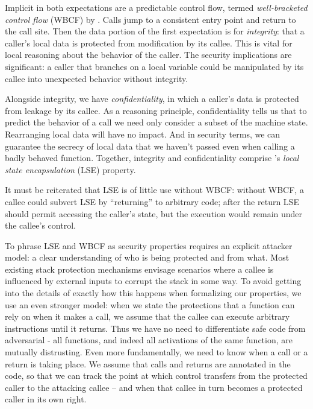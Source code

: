 \documentclass[acmsmall,review,anonymous]{acmart}\settopmatter{printfolios=true,printccs=false,printacmref=false}
\begin{document}

Implicit in both expectations are a predictable control flow, termed {\em well-bracketed
control flow} (WBCF) by \citeauthor{Skorstengaard+19}. Calls jump to a consistent entry
point and return to the call site. Then the data portion of the first expectation is for
{\em integrity}: that a caller's local data is protected from modification by its callee.
This is vital for local reasoning about the behavior of the caller. The security implications
are significant: a caller that branches on a local variable could be manipulated by its
callee into unexpected behavior without integrity.

Alongside integrity, we have {\em confidentiality}, in which a caller's data is protected
from leakage by its callee. As a reasoning principle, confidentiality tells us that to
predict the behavior of a call we need only consider a subset of the machine state.
Rearranging local data will have no impact. And in security terms, we can guarantee
the secrecy of local data that we haven't passed even when calling a badly behaved function.
Together, integrity and confidentiality comprise \citeauthor{Skorstengaard+19}'s
{\em local state encapsulation} (LSE) property.

It must be reiterated that LSE is of little use without WBCF: without WBCF, a callee
could subvert LSE by ``returning'' to arbitrary code; after the return LSE should permit
accessing the caller's state, but the execution would remain under the callee's control.

To phrase LSE and WBCF as security properties requires an explicit attacker model:
a clear understanding of who is being protected and from what. Most existing
stack protection mechanisms envisage scenarios where a callee is
influenced by external inputs to corrupt the stack in some way. To
avoid getting into the details of exactly how this happens when
formalizing our properties, we use an even stronger model: when we
state the protections that a function can rely on when it makes a
call, we assume that the callee can execute arbitrary instructions
until it returns. Thus we have no need to differentiate safe code
from adversarial - all functions, and indeed all activations of the same function,
are mutually distrusting.
%
Even more fundamentally, we need to know when a call or a return is taking
place. We assume that calls and returns are annotated in the code, so that
we can track the point at which control transfers from the protected caller
to the attacking callee -- and when that callee in turn becomes a protected
caller in its own right.
\end{document}
